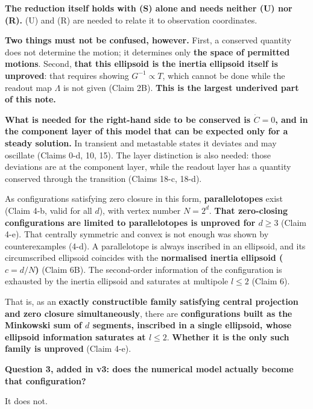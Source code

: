 \documentclass[
  10pt,
]{article}
\begin{document}
\textbf{The reduction itself holds with (S) alone and needs neither (U)
nor (R).} (U) and (R) are needed to relate it to observation
coordinates.

\textbf{Two things must not be confused, however.} First, a conserved
quantity does not determine the motion; it determines only \textbf{the
space of permitted motions}. Second, \textbf{that this ellipsoid is the
inertia ellipsoid itself is unproved}: that requires showing
\(G^{-1}\propto T\), which cannot be done while the readout map
\(\Lambda\) is not given (Claim 2B). \textbf{This is the largest
underived part of this note.}

\textbf{What is needed for the right-hand side to be conserved is
\(\dot C = 0\), and in the component layer of this model that can be
expected only for a steady solution.} In transient and metastable states
it deviates and may oscillate (Claims 0-d, 10, 15). The layer
distinction is also needed: those deviations are at the component layer,
while the readout layer has a quantity conserved through the transition
(Claims 18-c, 18-d).

As configurations satisfying zero closure in this form,
\textbf{parallelotopes} exist (Claim 4-b, valid for all \(d\)), with
vertex number \(N=2^d\). \textbf{That zero-closing configurations are
limited to parallelotopes is unproved for \(d\ge3\)} (Claim 4-e). That
centrally symmetric and convex is not enough was shown by
counterexamples (4-d). A parallelotope is always inscribed in an
ellipsoid, and its circumscribed ellipsoid coincides with the
\textbf{normalised inertia ellipsoid (\(c=d/N\))} (Claim 6B). The
second-order information of the configuration is exhausted by the
inertia ellipsoid and saturates at multipole \(l\le2\) (Claim 6).

That is, as an \textbf{exactly constructible family satisfying central
projection and zero closure simultaneously}, there are
\textbf{configurations built as the Minkowski sum of \(d\) segments,
inscribed in a single ellipsoid, whose ellipsoid information saturates
at \(l\le2\)}. \textbf{Whether it is the only such family is unproved}
(Claim 4-e).

\textbf{Question 3, added in v3: does the numerical model actually
become that configuration?}

It does not.
\end{document}
